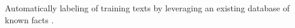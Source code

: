
{%
  Automatically labeling of training texts by leveraging an existing database of known facts \cite{reschke2014event}.
}

